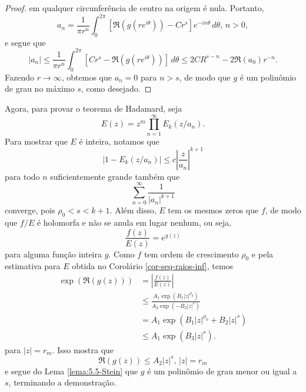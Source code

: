 \begin{proof}
        em qualquer circunferência de centro na origem é nula. Portanto,
        \begin{equation*}
            a_n 
            = 
            \frac{1}{\pi r^n} \int_0^{2\pi} \left[ \Re(g(re^{i\theta})) - Cr^s \right]e^{-in\theta}
            \, d\theta, \, n > 0,
        \end{equation*}
        e segue que
        \begin{equation*}
            |a_n| 
            \leq
            \frac{1}{\pi r^n} 
            \int_0^{2\pi} \left[ Cr^s - \Re(g(re^{i\theta})) \right] \, d\theta
            \leq
            2CR^{s-n} - 2\Re(a_0)r^{-n}.
        \end{equation*}
        Fazendo $r\to\infty$, obtemos que $a_n = 0$ para $n > s$, de modo que $g$
        é um polinômio de grau no máximo $s$, como desejado.
    \end{proof}
    Agora, para provar o teorema de Hadamard, seja
    \begin{equation*}
        E(z) = z^m \prod_{n=1}^{\infty} E_k(z/a_n).
    \end{equation*}
    Para mostrar que $E$ é inteira, notamos que
    \begin{equation*}
        |1 - E_k(z/a_n)| \leq c\left| \frac{z}{a_n} \right|^{k+1}
    \end{equation*}
    para todo $n$ suficientemente grande também que
    \begin{equation*}
        \sum_{n=0}^{\infty} \frac{1}{|a_n|^{k+1}}
    \end{equation*}
    converge, pois $\rho_0 < s < k+1$. Além disso, $E$ tem os mesmos zeros 
    que $f$, de modo que $f/E$ é holomorfa e não se anula em lugar nenhum,
    ou seja,
    \begin{equation*}
        \frac{f(z)}{E(z)} = e^{g(z)}
    \end{equation*}
    para alguma função inteira $g$. Como $f$ tem ordem de crescimento
    $\rho_0$ e pela estimativa para $E$ obtida no Corolário \ref{cor-seq-raios-inf},
    temos
    \begin{align*}
        \exp(\Re(g(z))) &= \left| \frac{f(z)}{E(z)} \right| \\
                        &\leq \frac{A_1 \exp( B_1|z|^{\rho_0} )}{A_2 \exp( -B_2|z|^{s} )} \\
                        &= A_1 \exp(B_1 |z|^{\rho_0} + B_2 |z|^s) \\
                        &\leq A_1 \exp(B_3 |z|^s).
    \end{align*}
    para $|z| = r_m$. Isso mostra que
    \begin{equation*}
        \Re(g(z)) \leq A_2|z|^s, \, |z| = r_m
    \end{equation*}
    e segue do Lema \ref{lema:5.5-Stein} que $g$ é um polinômio de grau menor
    ou igual a $s$, terminando a demonstração.